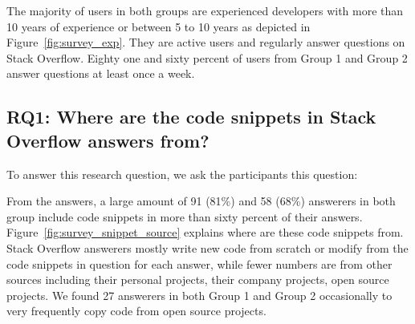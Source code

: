 \documentclass{svjour3}                     %
\begin{document}
\vspace{0.5cm}
\noindent{}
\vspace{0.5cm}

The majority of users in both groups are experienced developers 
with more than 10 years of experience or between 5 to 10 years 
as depicted in Figure~\ref{fig:survey_exp}. They are active users and
regularly answer questions on Stack Overflow.
Eighty one and sixty percent of users from Group 1 and Group 2 
answer questions at least once a week.

\vspace{0.5cm}
\noindent{}
\vspace{0.5cm}

\vspace{0.5cm}
\noindent{}
\vspace{0.5cm}

\subsection{RQ1: Where are the code snippets in Stack Overflow answers from?} 

To answer this research question, we ask the participants this question:

\vspace{0.5cm}
\noindent{}
\vspace{0.5cm}

From the answers, a large amount of 91 (81\%) and 58
(68\%) answerers in both group include code snippets in more than sixty percent of
their answers. Figure~\ref{fig:survey_snippet_source} explains where are these code
snippets from. Stack Overflow answerers mostly write new code from scratch 
or modify from the code snippets in question for each answer, while 
fewer numbers are from other sources including their personal projects, 
their company projects, open source projects. We found 27 answerers in both Group 1
and Group 2 occasionally to very frequently copy code from open source projects.
\end{document}
